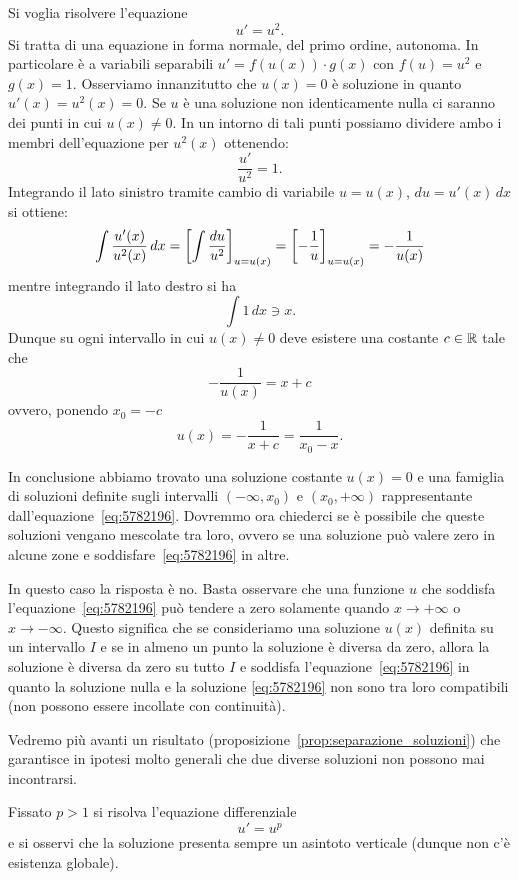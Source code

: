 \begin{example}
Si voglia risolvere l'equazione
\[
  u' = u^2.
\]
Si tratta di una equazione in forma normale, del primo ordine, autonoma.
In particolare è a variabili separabili
$u' = f(u(x))\cdot g(x)$
con $f(u)=u^2$ e $g(x)=1$.
Osserviamo innanzitutto che $u(x) = 0$ è soluzione in quanto $u'(x) = u^2(x) = 0$.
Se $u$ è una soluzione non identicamente nulla ci saranno dei punti in cui
$u(x)\neq 0$.
In un intorno di tali punti possiamo dividere ambo i membri dell'equazione per $u^2(x)$ ottenendo:
\[
  \frac{u'}{u^2} = 1.
\]
Integrando il lato sinistro tramite cambio di variabile $u=u(x)$, $du=u'(x)\, dx$ si ottiene:
\[
  \int \frac{u'(x)}{u^2(x)}\, dx = {\left[ \int \frac{du}{u^2} \right]}_{u=u(x)} = {\left[ -\frac{1}{u} \right]}_{u=u(x)}
  = -\frac{1}{u(x)}
\]
mentre integrando il lato destro si ha
\[
  \int 1 \, dx \ni x.
\]
Dunque su ogni intervallo in cui $u(x)\neq 0$ deve esistere una costante $c\in {\mathbb R}$ tale che
\[
-\frac{1}{u(x)} = x + c
\]
ovvero, ponendo $x_0 = -c$
\begin{equation}\label{eq:5782196}
  u(x) = -\frac{1}{x+c} = \frac{1}{x_0-x}.
\end{equation}

In conclusione abbiamo trovato una soluzione costante $u(x)=0$ e una famiglia
di soluzioni definite sugli intervalli $(-\infty,x_0)$ e $(x_0,+\infty)$
rappresentante dall'equazione~\eqref{eq:5782196}.
Dovremmo ora chiederci
se è possibile che queste soluzioni vengano mescolate tra loro, ovvero
se una soluzione può valere zero in alcune zone e soddisfare~\eqref{eq:5782196}
in altre.

In questo caso la risposta è no.
Basta osservare che una funzione $u$ che soddisfa l'equazione~\eqref{eq:5782196}
può tendere a zero solamente quando $x\to +\infty$ o $x\to -\infty$.
Questo significa che se consideriamo una soluzione $u(x)$
definita su un intervallo $I$ e se in almeno un punto la soluzione è diversa da zero,
allora la soluzione è diversa da zero su tutto $I$ e
soddisfa l'equazione~\eqref{eq:5782196} in quanto la soluzione nulla e la
soluzione \eqref{eq:5782196} non sono tra loro compatibili (non possono essere
incollate con continuità).

Vedremo più avanti un risultato
(proposizione~\ref{prop:separazione_soluzioni})
che garantisce in ipotesi molto generali che due diverse soluzioni non
possono mai incontrarsi.
\end{example}

\begin{exercise}
Fissato $p>1$ si risolva l'equazione differenziale
\[
  u' = u^p
\]
e si osservi che la soluzione presenta sempre un asintoto verticale
(dunque non c'è esistenza globale).
\end{exercise}

